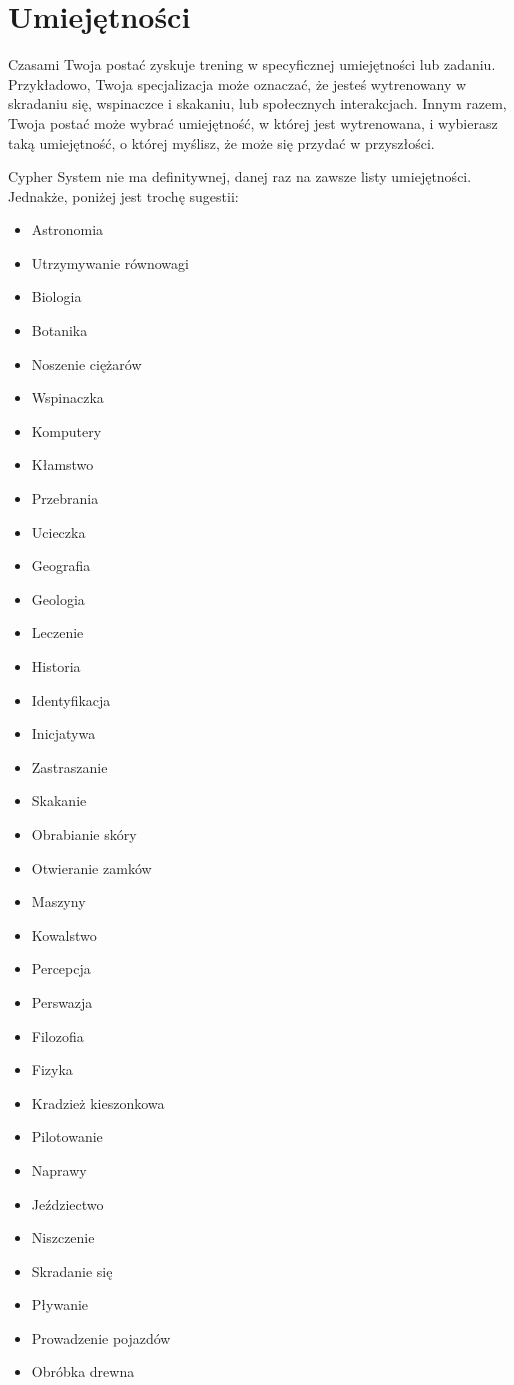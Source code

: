 \section{Umiejętności}

Czasami Twoja postać zyskuje trening w specyficznej umiejętności lub zadaniu. Przykładowo, Twoja specjalizacja może oznaczać, że jesteś wytrenowany w skradaniu się, wspinaczce i skakaniu, lub społecznych interakcjach. Innym razem, Twoja postać może wybrać umiejętność, w której jest wytrenowana, i wybierasz taką umiejętność, o której myślisz, że może się przydać w przyszłości.

Cypher System nie ma definitywnej, danej raz na zawsze listy umiejętności. Jednakże, poniżej jest trochę sugestii:

\begin{itemize}
     \item  Astronomia
    \item Utrzymywanie równowagi
    \item Biologia
    \item Botanika
    \item Noszenie ciężarów
    \item Wspinaczka
    \item Komputery
    \item Kłamstwo
    \item Przebrania
    \item Ucieczka
    \item Geografia
    \item Geologia
    \item Leczenie
    \item Historia
    \item Identyfikacja
    \item Inicjatywa
    \item Zastraszanie
    \item Skakanie
    \item Obrabianie skóry
    \item Otwieranie zamków
    \item Maszyny
    \item Kowalstwo
    \item Percepcja
    \item Perswazja
    \item Filozofia
    \item Fizyka
    \item Kradzież kieszonkowa
    \item Pilotowanie
    \item Naprawy
    \item Jeździectwo
    \item Niszczenie
    \item Skradanie się
    \item Pływanie
    \item Prowadzenie pojazdów
    \item Obróbka drewna
 \end{itemize}  
   
